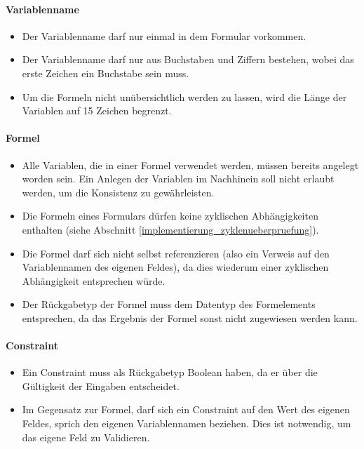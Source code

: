 \paragraph{Variablenname}
\begin{itemize}
	\item Der Variablenname darf nur einmal in dem Formular vorkommen.
	\item Der Variablenname darf nur aus Buchstaben und Ziffern bestehen, wobei das erste Zeichen ein Buchstabe sein muss.
	\item Um die Formeln nicht unübersichtlich werden zu lassen, wird die Länge der Variablen auf 15 Zeichen begrenzt.
\end{itemize}

\paragraph{Formel}
\begin{itemize}
	\item Alle Variablen, die in einer Formel verwendet werden, müssen bereits angelegt worden sein. Ein Anlegen der Variablen im Nachhinein soll nicht erlaubt werden, um die Konsistenz zu gewährleisten.
	\item Die Formeln eines Formulars dürfen keine zyklischen Abhängigkeiten enthalten (siehe Abschnitt \ref{implementierung_zyklenueberpruefung}).
	\item Die Formel darf sich nicht selbst referenzieren (also ein Verweis auf den Variablennamen des eigenen Feldes), da dies wiederum einer zyklischen Abhängigkeit entsprechen würde.
	\item Der Rückgabetyp der Formel muss dem Datentyp des Formelements entsprechen, da das Ergebnis der Formel sonst nicht zugewiesen werden kann.
\end{itemize}

\paragraph{Constraint}
\begin{itemize}
	\item Ein Constraint muss als Rückgabetyp Boolean haben, da er über die Gültigkeit der Eingaben entscheidet.
	\item Im Gegensatz zur Formel, darf sich ein Constraint auf den Wert des eigenen Feldes, sprich den eigenen Variablennamen beziehen. Dies ist notwendig, um das eigene Feld zu Validieren.
	
\end{itemize}

